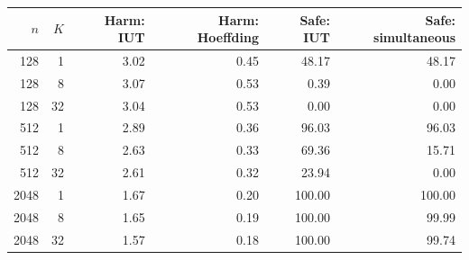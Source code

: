 \begin{tabular}{rrrrrr}
\toprule
$n$ & $K$ & Harm: IUT & Harm: Hoeffding & Safe: IUT & Safe: simultaneous \\
\midrule
128 & 1 & 3.02 & 0.45 & 48.17 & 48.17 \\
128 & 8 & 3.07 & 0.53 & 0.39 & 0.00 \\
128 & 32 & 3.04 & 0.53 & 0.00 & 0.00 \\
512 & 1 & 2.89 & 0.36 & 96.03 & 96.03 \\
512 & 8 & 2.63 & 0.33 & 69.36 & 15.71 \\
512 & 32 & 2.61 & 0.32 & 23.94 & 0.00 \\
2048 & 1 & 1.67 & 0.20 & 100.00 & 100.00 \\
2048 & 8 & 1.65 & 0.19 & 100.00 & 99.99 \\
2048 & 32 & 1.57 & 0.18 & 100.00 & 99.74 \\
\bottomrule
\end{tabular}
